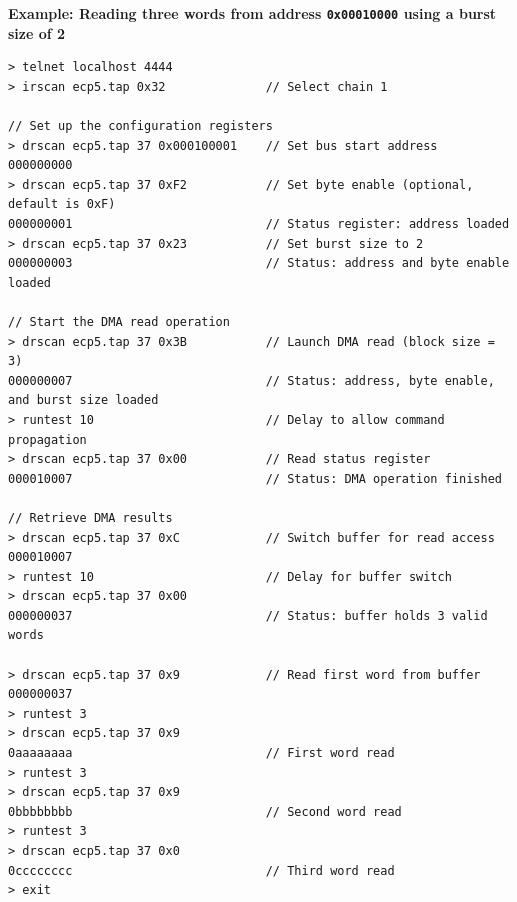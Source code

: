 \documentclass[a4paper,11pt,oneside]{report}
\begin{document}
\vspace{1em}
\noindent\textbf{Example: Reading three words from address \texttt{0x00010000} using a burst size of 2}
\begin{lstlisting}
> telnet localhost 4444
> irscan ecp5.tap 0x32              // Select chain 1

// Set up the configuration registers
> drscan ecp5.tap 37 0x000100001    // Set bus start address
000000000
> drscan ecp5.tap 37 0xF2           // Set byte enable (optional, default is 0xF)
000000001                           // Status register: address loaded
> drscan ecp5.tap 37 0x23           // Set burst size to 2
000000003                           // Status: address and byte enable loaded

// Start the DMA read operation
> drscan ecp5.tap 37 0x3B           // Launch DMA read (block size = 3)
000000007                           // Status: address, byte enable, and burst size loaded
> runtest 10                        // Delay to allow command propagation
> drscan ecp5.tap 37 0x00           // Read status register
000010007                           // Status: DMA operation finished

// Retrieve DMA results
> drscan ecp5.tap 37 0xC            // Switch buffer for read access
000010007
> runtest 10                        // Delay for buffer switch
> drscan ecp5.tap 37 0x00
000000037                           // Status: buffer holds 3 valid words

> drscan ecp5.tap 37 0x9            // Read first word from buffer
000000037
> runtest 3
> drscan ecp5.tap 37 0x9
0aaaaaaaa                           // First word read
> runtest 3
> drscan ecp5.tap 37 0x9
0bbbbbbbb                           // Second word read
> runtest 3
> drscan ecp5.tap 37 0x0
0cccccccc                           // Third word read
> exit
\end{lstlisting}
\end{document}
